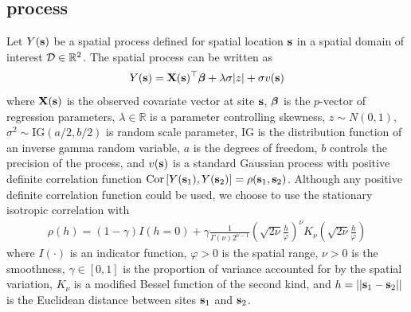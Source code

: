 \subsection{\Skewt process} \label{sts:skewt}
Let $Y(\mathbf{s})$ be a spatial process defined for spatial location $\mathbf{s}$ in a spatial domain of interest ${\cal D} \in \mathbb{R}^2$.
The spatial \skewt process can be written as
\begin{align}
  Y(\mathbf{s}) = \mathbf{X}(\mathbf{s})^\top \mbox{\boldmath $\beta$} + \lambda \sigma |z| + \sigma v(\mathbf{s}) \label{steq:fullmodel}
\end{align}
where $\mathbf{X}(\mathbf{s})$ is the observed covariate vector at site $\mathbf{s}$, $\mbox{\boldmath $\beta$}$ is the $p$-vector of regression parameters, $\lambda \in \mathbb{R}$ is a parameter controlling skewness, $z \sim N(0, 1)$, $\sigma^2 \sim \mathrm{IG}(a / 2, b / 2)$ is random scale parameter, IG is the distribution function of an inverse gamma random variable, $a$ is the degrees of freedom, $b$ controls the precision of the process, and $v(\mathbf{s})$ is a standard Gaussian process with positive definite correlation function $\text{Cor} \left[Y(\mathbf{s}_1), Y(\mathbf{s}_2)\right] = \rho(\mathbf{s}_1, \mathbf{s}_2)$.
Although any positive definite correlation function could be used, we choose to use the stationary isotropic \Matern correlation with
\begin{align}
  \rho(h) = (1 - \gamma) I(h = 0) + \gamma \frac{ 1 }{ \Gamma(\nu) 2^{ \nu - 1}} \left( \sqrt{2\nu} \frac{ h }{ \varphi } \right)^{\nu} K_{\nu} \left( \sqrt{2\nu} \frac{ h }{ \varphi } \right) \label{steq:matern}
\end{align}
where $I(\cdot)$ is an indicator function, $\varphi > 0$ is the spatial range, $\nu > 0$ is the smoothness, $\gamma \in [0, 1]$ is the proportion of variance accounted for by the spatial variation, $K_\nu$ is a modified Bessel function of the second kind, and $h = || \mathbf{s}_1 - \mathbf{s}_2 ||$ is the Euclidean distance between sites $\mathbf{s}_1$ and $\mathbf{s}_2$.

